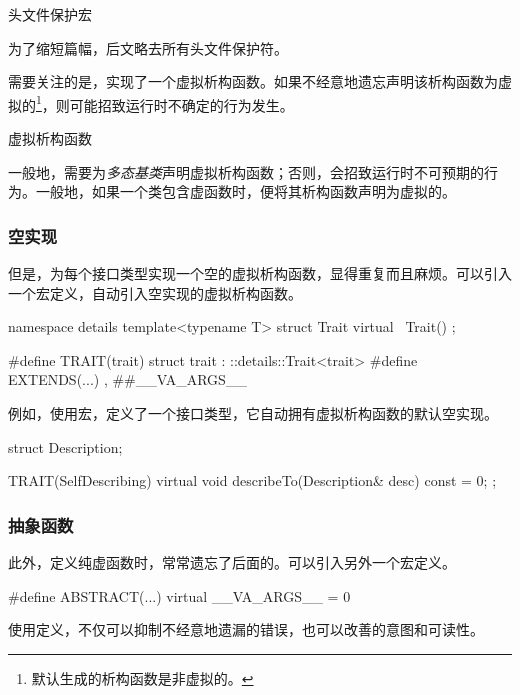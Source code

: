 \begin{content}
\begin{episode}{头文件保护宏}
\begin{content}
为了缩短篇幅，后文略去所有头文件保护符。

\end{content}

\end{episode}

需要关注的是，实现了一个虚拟析构函数。如果不经意地遗忘声明该析构函数为虚拟的\footnote{默认生成的析构函数是非虚拟的。}，则可能招致运行时不确定的行为发生。

\begin{episode}{虚拟析构函数}

\begin{content}

一般地，需要为\emph{多态基类}声明虚拟析构函数；否则，会招致运行时不可预期的行为。一般地，如果一个类包含虚函数时，便将其析构函数声明为虚拟的。

\subsubsection{空实现}

但是，为每个接口类型实现一个空的虚拟析构函数，显得重复而且麻烦。可以引入一个宏定义，自动引入空实现的虚拟析构函数。

 \begin{c++}
namespace details {
  template<typename T>
  struct Trait {
    virtual ~Trait() {}
  };
}

#define TRAIT(trait)  struct trait : ::details::Trait<trait>
#define EXTENDS(...) , ##__VA_ARGS__
 \end{c++}

例如，使用宏，定义了一个接口类型，它自动拥有虚拟析构函数的默认空实现。

 \begin{c++}
struct Description;

TRAIT(SelfDescribing) {
  virtual void describeTo(Description& desc) const = 0;
};
 \end{c++}

\subsubsection{抽象函数}

此外，定义纯虚函数时，常常遗忘了后面的。可以引入另外一个宏定义。

 \begin{c++}
#define ABSTRACT(...) virtual __VA_ARGS__ = 0
 \end{c++}

使用定义，不仅可以抑制不经意地遗漏的错误，也可以改善的意图和可读性。


\end{content}
\end{episode}
\end{content}
